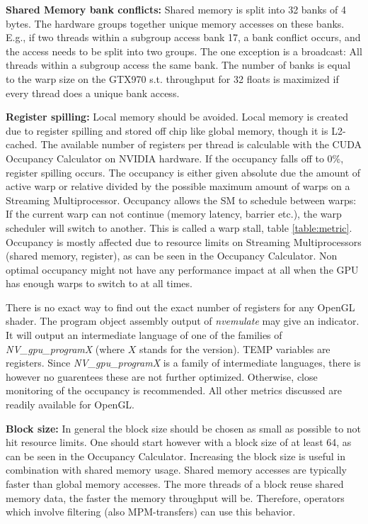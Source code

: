 \documentclass[m,times]{cgMA}
\begin{document}
\textbf{Shared Memory bank conflicts:} Shared memory is split into 32 banks of 4 bytes. The hardware groups together unique memory accesses on these banks. E.g., if two threads within a subgroup access bank 17, a bank conflict occurs, and the access needs to be split into two groups. The one exception is a broadcast: All threads within a subgroup access the same bank. The number of banks is equal to the warp size on the GTX970 s.t. throughput for 32 floats is maximized if every thread does a unique bank access. \cite{NVIDIA:BEST:PRACTICE}


\textbf{Register spilling:} Local memory should be avoided. Local memory is created due to register spilling and stored off chip like global memory, though it is L2-cached. The available number of registers per thread is calculable with the CUDA Occupancy Calculator \cite{NVIDIA:OCCUPANCY} on NVIDIA hardware. If the occupancy falls off to 0\%, register spilling occurs. The occupancy is either given absolute due the amount of active warp or relative divided by the possible maximum amount of warps on a Streaming Multiprocessor. Occupancy allows the SM to schedule between warps: If the current warp can not continue (memory latency, barrier etc.), the warp scheduler will switch to another. This is called a warp stall, table \ref{table:metric}. Occupancy is mostly affected due to resource limits on Streaming Multiprocessors (shared memory, register), as can be seen in the Occupancy Calculator. Non optimal occupancy might not have any performance impact at all when the GPU has enough warps to switch to at all times. \cite{NVIDIA:ACHIEVED_OCCUPANCY}

There is no exact way to find out the exact number of registers for any OpenGL shader. The program object assembly output of \textit{nvemulate} \cite{NVIDIA:EMULATE} may give an indicator. It will output an intermediate language of one of the families of \textit{NV\_gpu\_\-programX} (where $X$ stands for the version). TEMP variables are registers. Since \textit{NV\_gpu\_programX} is a family of intermediate languages, there is however no guarentees these are not further optimized. Otherwise, close monitoring of the occupancy is recommended. All other metrics discussed are readily available for OpenGL.

\textbf{Block size:} In general the block size should be chosen as small as possible to not hit resource limits. One should start however with a block size of at least 64, as can be seen in the Occupancy Calculator. Increasing the block size is useful in combination with shared memory usage. Shared memory accesses are typically faster than global memory accesses. The more threads of a block reuse shared memory data, the faster the memory throughput will be. Therefore, operators which involve filtering (also MPM-transfers) can use this behavior.
\end{document}

